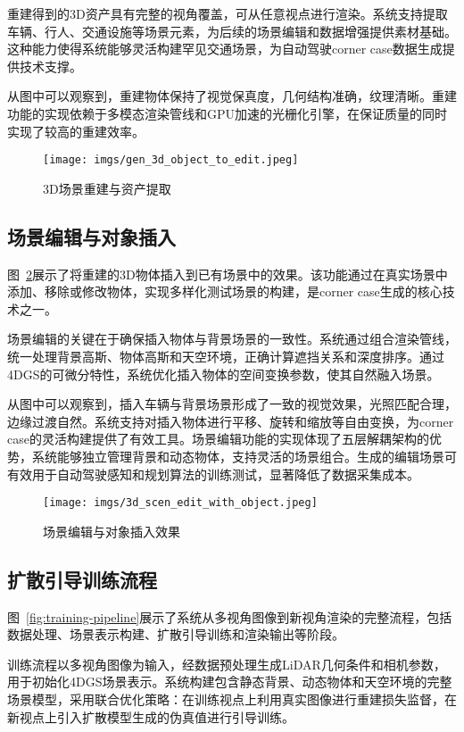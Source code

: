 重建得到的3D资产具有完整的视角覆盖，可从任意视点进行渲染。系统支持提取车辆、行人、交通设施等场景元素，为后续的场景编辑和数据增强提供素材基础。这种能力使得系统能够灵活构建罕见交通场景，为自动驾驶corner case数据生成提供技术支撑。

从图中可以观察到，重建物体保持了视觉保真度，几何结构准确，纹理清晰。重建功能的实现依赖于多模态渲染管线和GPU加速的光栅化引擎，在保证质量的同时实现了较高的重建效率。

\begin{figure}[htbp]
  \centering
  \texttt{[image: imgs/gen\_3d\_object\_to\_edit.jpeg]}
  \caption{3D场景重建与资产提取}
  \label{fig:gen-3d-object}
\end{figure}

\subsection{场景编辑与对象插入}

图~\ref{fig:scene-edit}展示了将重建的3D物体插入到已有场景中的效果。该功能通过在真实场景中添加、移除或修改物体，实现多样化测试场景的构建，是corner case生成的核心技术之一。

场景编辑的关键在于确保插入物体与背景场景的一致性。系统通过组合渲染管线，统一处理背景高斯、物体高斯和天空环境，正确计算遮挡关系和深度排序。通过4DGS的可微分特性，系统优化插入物体的空间变换参数，使其自然融入场景。

从图中可以观察到，插入车辆与背景场景形成了一致的视觉效果，光照匹配合理，边缘过渡自然。系统支持对插入物体进行平移、旋转和缩放等自由变换，为corner case的灵活构建提供了有效工具。场景编辑功能的实现体现了五层解耦架构的优势，系统能够独立管理背景和动态物体，支持灵活的场景组合。生成的编辑场景可有效用于自动驾驶感知和规划算法的训练测试，显著降低了数据采集成本。

\begin{figure}[htbp]
  \centering
  \texttt{[image: imgs/3d\_scen\_edit\_with\_object.jpeg]}
  \caption{场景编辑与对象插入效果}
  \label{fig:scene-edit}
\end{figure}

\subsection{扩散引导训练流程}

图~\ref{fig:training-pipeline}展示了系统从多视角图像到新视角渲染的完整流程，包括数据处理、场景表示构建、扩散引导训练和渲染输出等阶段。

训练流程以多视角图像为输入，经数据预处理生成LiDAR几何条件和相机参数，用于初始化4DGS场景表示。系统构建包含静态背景、动态物体和天空环境的完整场景模型，采用联合优化策略：在训练视点上利用真实图像进行重建损失监督，在新视点上引入扩散模型生成的伪真值进行引导训练。

